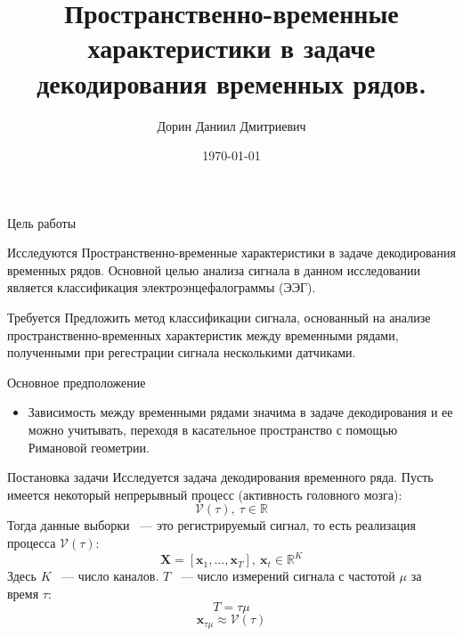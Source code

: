 \documentclass[9pt,pdf]{beamer} %
\title{Пространственно-временные характеристики в задаче декодирования временных рядов.}
\author{Дорин Даниил Дмитриевич}
\date{\today}
\institute[Московский физико-технический институт]{Московский физико-технический институт }
\begin{document}
	\begin{frame}{}
		\maketitle
	\end{frame}

\begin{frame}{Цель работы}
    \begin{block}{Исследуются}
        Пространственно-временные характеристики в задаче декодирования временных рядов. Основной целью анализа сигнала в данном исследовании является классификация электроэнцефалограммы (ЭЭГ).
    \end{block}
    
    \begin{block}{Требуется}
        Предложить метод классификации сигнала, основанный на анализе пространственно-временных характеристик между временными рядами, полученными при регестрации сигнала несколькими датчиками.
    \end{block}
    \begin{block}{Основное предположение}
    \begin{itemize}
        \item Зависимость между временными рядами значима в задаче декодирования и ее можно учитывать, переходя в касательное пространство с помощью Римановой геометрии.
    \end{itemize}
    \end{block}
\end{frame}

\begin{frame}{Постановка задачи}
    Исследуется задача декодирования временного ряда. Пусть имеется некоторый непрерывный процесс (активность головного мозга):
$$\mathcal{V}(\tau),~\tau \in \mathbb{R}$$
Тогда данные выборки ~--- это регистрируемый сигнал, то есть реализация процесса $\mathcal{V}(\tau)$:
$$\bm{X} = \left[\bm{x}_1,\dots, \bm{x}_{T}\right],~\bm{x}_t \in \mathbb{R}^K
$$
Здесь $K$ ~--- число каналов. $T$ ~--- число измерений сигнала с частотой $\mu$ за время $\tau$:
$$T = \tau \mu$$
$$\bm{x}_{\tau \mu} \approx \mathcal{V}(\tau)$$
\end{frame}
\end{document}
